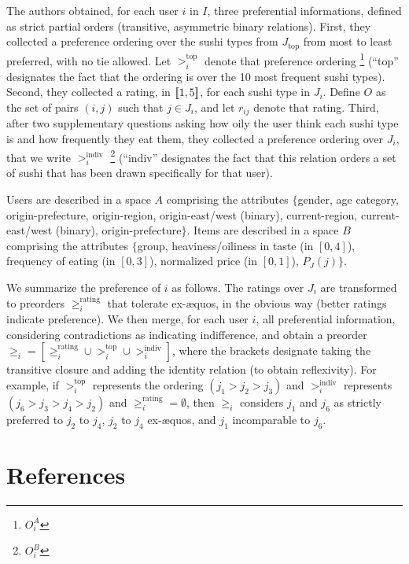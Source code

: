 \documentclass[version=last, pagesize, twoside=off, bibliography=totoc, DIV=calc, fontsize=14pt, a4paper, french, english]{scrartcl}
\begin{document}
The authors obtained, for each user $i$ in $I$, three preferential informations, defined as strict partial orders (transitive, asymmetric binary relations). First, they collected a preference ordering over the sushi types from $J_\text{top}$ from most to least preferred, with no tie allowed. Let $>^\text{top}_i$ denote that preference ordering \footnote{$O^A_i$} (“top” designates the fact that the ordering is over the 10 most frequent sushi types). Second, they collected a rating, in $\lbrack\!\lbrack{}1, 5\rbrack\!\rbrack$, for each sushi type in $J_i$. Define $O$ as the set of pairs $(i, j)$ such that $j \in J_i$, and let $r_{ij}$ denote that rating. Third, after two supplementary questions asking how oily the user think each sushi type is and how frequently they eat them, they collected a preference ordering over $J_i$, that we write $>^\text{indiv}_i$ \footnote{$O^B_i$} (“indiv” designates the fact that this relation orders a set of sushi that has been drawn specifically for that user).

Users are described in a space $A$ comprising the attributes $\{$gender, age category, origin-prefecture, origin-region, origin-east/west (binary), current-region, current-east/west (binary), origin-prefecture$\}$. Items are described in a space $B$ comprising the attributes $\{$group, heaviness/oiliness in taste (in $[0, 4]$), frequency of eating (in $[0, 3]$), normalized price (in $[0, 1]$), $P_J(j)$$\}$.

We summarize the preference of $i$ as follows. The ratings over $J_i$ are transformed to preorders $≥^\text{rating}_i$ that tolerate ex-æquos, in the obvious way (better ratings indicate preference). We then merge, for each user $i$, all preferential information, considering contradictions as indicating indifference, and obtain a preorder $≥_i = [≥^\text{rating}_i ∪ >^\text{top}_i ∪ >^\text{indiv}_i]$, where the brackets designate taking the transitive closure and adding the identity relation (to obtain reflexivity). For example, if $>^\text{top}_i$ represents the ordering $(j_1 > j_2 > j_3)$ and $>^\text{indiv}_i$ represents $(j_6 > j_3 > j_4 > j_2)$ and $≥^\text{rating}_i = \emptyset$, then $≥_i$ considers $j_1$ and $j_6$ as strictly preferred to $j_2$ to $j_4$, $j_2$ to $j_4$ ex-æquos, and $j_1$ incomparable to $j_6$.

\section{References}

\end{document}
